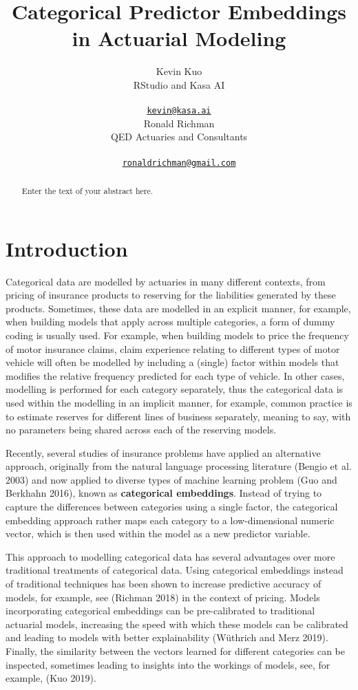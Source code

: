 \documentclass{article}
\title{Categorical Predictor Embeddings in Actuarial Modeling}
\author{
    Kevin Kuo
   \\
    RStudio and Kasa AI \\
   \\
  \texttt{\href{mailto:kevin@kasa.ai}{\nolinkurl{kevin@kasa.ai}}} \\
   \And
    Ronald Richman
   \\
    QED Actuaries and Consultants \\
   \\
  \texttt{\href{mailto:ronaldrichman@gmail.com}{\nolinkurl{ronaldrichman@gmail.com}}} \\
  }
\begin{document}
\maketitle

\def\tightlist{}


\begin{abstract}
Enter the text of your abstract here.
\end{abstract}


\hypertarget{introduction}{%
\section{Introduction}\label{introduction}}

Categorical data are modelled by actuaries in many different contexts,
from pricing of insurance products to reserving for the liabilities
generated by these products. Sometimes, these data are modelled in an
explicit manner, for example, when building models that apply across
multiple categories, a form of dummy coding is usually used. For
example, when building models to price the frequency of motor insurance
claims, claim experience relating to different types of motor vehicle
will often be modelled by including a (single) factor within models that
modifies the relative frequency predicted for each type of vehicle. In
other cases, modelling is performed for each category separately, thus
the categorical data is used within the modelling in an implicit manner,
for example, common practice is to estimate reserves for different lines
of business separately, meaning to say, with no parameters being shared
across each of the reserving models.

Recently, several studies of insurance problems have applied an
alternative approach, originally from the natural language processing
literature (Bengio et al. 2003) and now applied to diverse types of
machine learning problem (Guo and Berkhahn 2016), known as
\textbf{categorical embeddings}. Instead of trying to capture the
differences between categories using a single factor, the categorical
embedding approach rather maps each category to a low-dimensional
numeric vector, which is then used within the model as a new predictor
variable.

This approach to modelling categorical data has several advantages over
more traditional treatments of categorical data. Using categorical
embeddings instead of traditional techniques has been shown to increase
predictive accuracy of models, for example, see (Richman 2018) in the
context of pricing. Models incorporating categorical embeddings can be
pre-calibrated to traditional actuarial models, increasing the speed
with which these models can be calibrated and leading to models with
better explainability (Wüthrich and Merz 2019). Finally, the similarity
between the vectors learned for different categories can be inspected,
sometimes leading to insights into the workings of models, see, for
example, (Kuo 2019).
\end{document}
